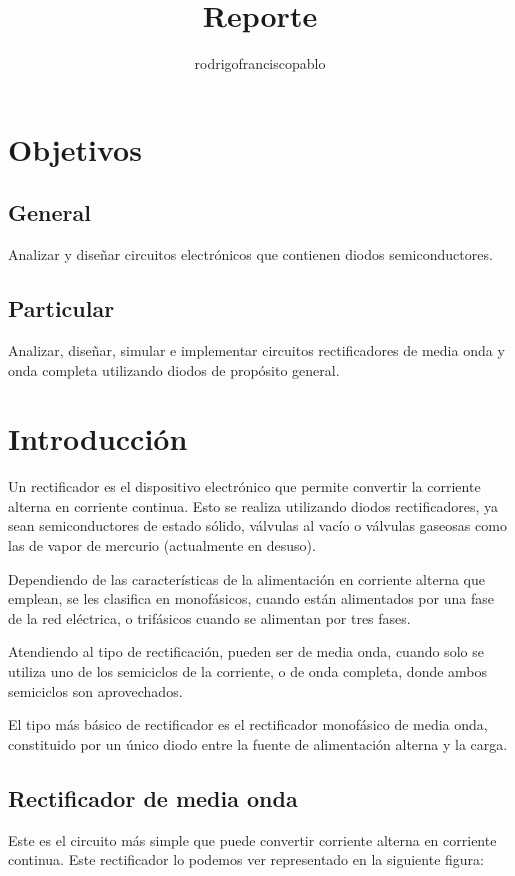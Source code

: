 \documentclass{mylib/reporteConCalif}
\title{Reporte}
\author{rodrigofranciscopablo }
\begin{document}
\coverPage

\tableofcontents
\newpage

\section{Objetivos}

\subsection{General}

Analizar y diseñar circuitos electrónicos que contienen diodos semiconductores.

\subsection{Particular}

Analizar, diseñar, simular e implementar circuitos rectificadores de media onda y onda completa utilizando diodos de
propósito general.

\section{Introducción}

Un rectificador es el dispositivo electrónico que permite convertir la corriente alterna en corriente continua. Esto se realiza utilizando diodos rectificadores, ya sean semiconductores de estado sólido, válvulas al vacío o válvulas gaseosas como las de vapor de mercurio (actualmente en desuso).

Dependiendo de las características de la alimentación en corriente alterna que emplean, se les clasifica en monofásicos, cuando están alimentados por una fase de la red eléctrica, o trifásicos cuando se alimentan por tres fases.

Atendiendo al tipo de rectificación, pueden ser de media onda, cuando solo se utiliza uno de los semiciclos de la corriente, o de onda completa, donde ambos semiciclos son aprovechados.

El tipo más básico de rectificador es el rectificador monofásico de media onda, constituido por un único diodo entre la fuente de alimentación alterna y la carga.

\subsection{Rectificador de media onda}

Este es el circuito más simple que puede convertir corriente alterna en corriente continua. Este rectificador lo podemos ver representado en la siguiente figura:
\end{document}

